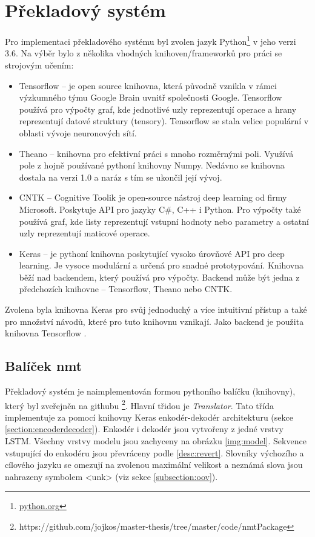 \section{Překladový systém}\label{section:nmtSystem}
Pro implementaci překladového systému byl zvolen jazyk Python\footnote{\url{python.org}} v jeho verzi 3.6. Na výběr bylo z několika vhodných knihoven/frameworků pro práci se strojovým učením:

\begin{itemize}
  \item Tensorflow -- je open source knihovna, která původně vznikla v rámci výzkumného týmu Google Brain uvnitř společnosti Google. Tensorflow používá pro výpočty graf, kde jednotlivé uzly reprezentují operace a hrany reprezentují datové struktury (tensory). Tensorflow se stala velice populární v oblasti vývoje neuronových sítí.
  \item Theano -- knihovna pro efektivní práci s mnoho rozměrnými poli. Využívá pole z hojně používané pythoní knihovny Numpy. Nedávno se knihovna dostala na verzi 1.0 a naráz s tím se ukončil její vývoj.
  \item CNTK -- Cognitive Toolik je open-source nástroj deep learning od firmy Microsoft. Poskytuje API pro jazyky C\#, C++ i Python. Pro výpočty také používá graf, kde listy reprezentují vstupní hodnoty nebo parametry a ostatní uzly reprezentují maticové operace.
  \item Keras -- je pythoní knihovna poskytující vysoko úrovňové API pro deep learning. Je vysoce modulární a určená pro snadné prototypování. Knihovna běží nad backendem, který používá pro výpočty. Backend může být jedna z předchozích knihovne -- Tensorflow, Theano nebo CNTK.
\end{itemize}

Zvolena byla knihovna Keras \cite{keras} pro svůj jednoduchý a více intuitivní přístup a také pro množství návodů, které pro tuto knihovnu vznikají. Jako backend je použita knihovna Tensorflow \cite{tensorflow}.

\subsection{Balíček nmt}
Překladový systém je naimplementován formou pythoního balíčku (knihovny), který byl zveřejněn na githubu \footnote{https://github.com/jojkos/master-thesis/tree/master/code/nmtPackage}. Hlavní třidou je \emph{Translator}. Tato třída implementuje za pomocí knihovny Keras enkodér-dekodér architekturu (sekce \ref{section:encoderdecoder}). Enkodér i dekodér jsou vytvořeny z jedné vrstvy LSTM. Všechny vrstvy modelu jsou zachyceny na obrázku \ref{img:model}. Sekvence vstupující do enkodéru jsou převráceny podle \ref{desc:revert}. Slovníky výchozího a cílového jazyku se omezují na zvolenou maximální velikost a neznámá slova jsou nahrazeny symbolem <unk> (viz sekce \ref{subsection:oov}).

